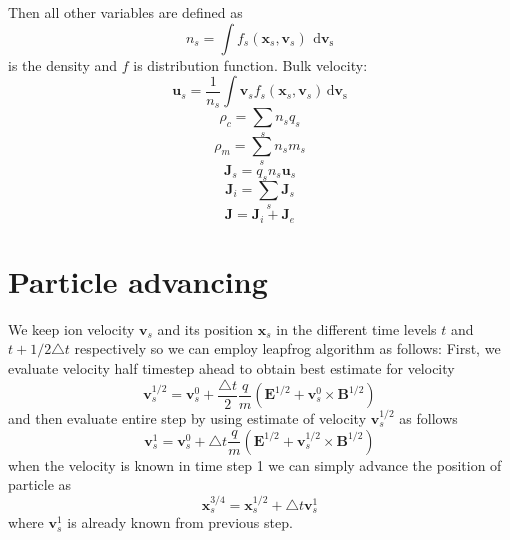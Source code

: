 \documentclass[oneside,branding,toc,article]{satdoc}
\begin{document}
Then all other variables are defined as
\begin{equation}
  n_s = \int f_s(\mathbf{x}_s,\mathbf{v}_s) ~ \, \mathrm{d\mathbf{v}_s}
\end{equation}
is the density and $f$ is distribution function. Bulk velocity:
\begin{equation}
  \mathbf{u}_s =
  \frac{1}{n_s} \int \mathbf{v}_s f_s(\mathbf{x}_s,\mathbf{v}_s) \, \mathrm{d\mathbf{v}_s}
\end{equation}
\begin{equation}
  \rho_c = \sum_{s}n_sq_s
\end{equation}
\begin{equation}
  \rho_m = \sum_{s}n_sm_s
\end{equation}
\begin{equation}
  \mathbf{J}_s = q_sn_s\mathbf{u}_s
\end{equation}
\begin{equation}
  \mathbf{J}_i = \sum_{s}\mathbf{J}_s
\end{equation}
\begin{equation}
  \mathbf{J} = \mathbf{J}_i + \mathbf{J}_e
\end{equation}

\section{Particle advancing}
We keep ion velocity $\mathbf{v}_s$ and its position $\mathbf{x}_s$ in the
different time levels $t$ and $t+1/2 \triangle t$ respectively so we can employ
leapfrog algorithm as follows: First, we evaluate velocity half timestep ahead
to obtain best estimate for velocity
\begin{equation}
  \label{eq:vh}
  \mathbf{v}_s^{1/2} = \mathbf{v}_s^{0} + \frac{\triangle t}{2} \frac{q}{m}
  \left( \mathbf{E}^{1/2} + \mathbf{v}_s^{0} \times \mathbf{B}^{1/2} \right)
\end{equation}
and then evaluate entire step by using estimate of velocity
$\mathbf{v}_s^{1/2}$ as follows
\begin{equation}
  \label{eq:vf}
  \mathbf{v}_s^{1} = \mathbf{v}_s^{0} + \triangle t \frac{q}{m}
  \left( \mathbf{E}^{1/2} + \mathbf{v}_s^{1/2} \times \mathbf{B}^{1/2} \right)
\end{equation}
when the velocity is known in time step 1 we can simply advance the position of
particle as
\begin{equation}
  \label{eq:x}
  \mathbf{x}_s^{3/4} = \mathbf{x}_s^{1/2} + \triangle t \mathbf{v}_s^{1}
\end{equation}
where $\mathbf{v}_s^{1}$ is already known from previous step.
\end{document}

